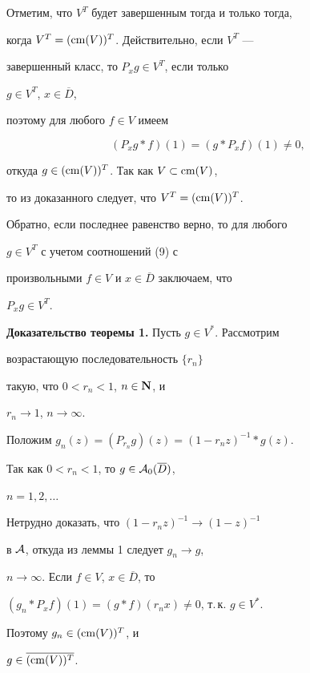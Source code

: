Отметим, что $V^T$ будет завершенным тогда и только тогда,


когда $V^T = (\operatorname{cm} (V))^T$. Действительно, если $V^T$ ---


завершенный класс, то $P_x g \in V^T$, если только 


$g\in V^T$, $x \in \overline{D}$, 


поэтому для любого $f\in V$ имеем


\begin{equation}


(P_x g*f)(1)= (g*P_x f)(1) \neq 0,


\end{equation}


откуда $g\in (\operatorname{cm} (V))^T$. Так как $V \subset \operatorname{cm} (V)$, 


то из доказанного следует, что $V^T =(\operatorname{cm} (V))^T$. 


Обратно, если последнее равенство верно, то для любого 


$g\in V^T$ с учетом соотношений (9) с


произвольными $f\in V$ и $x \in \overline{D}$ заключаем, что 


$P_x g \in V^T$.


\medskip





{\bf Доказательство теоремы 1.} Пусть $g\in V^*$. Рассмотрим 


возрастающую последовательность $\{ r_n \}$ 


такую, что $ 0<r_n <1$, $n \in \bold N$, и 


$r_n \to 1$, $n \to \infty$. 


Положим $g_n (z)= (P_{r_n} g)(z) = (1-r_n z)^{-1} * g(z)$. 


Так как $0<r_n <1$, то $g \in {\cal A}_0 (\overline{D})$, 


$n=1,2,\dots$ 


Нетрудно доказать, что $(1-r_n z)^{-1} \to (1-z)^{-1}$ 


в ${\cal A}$, откуда из леммы 1 следует $g_n{ \to} g$, 


$n{ \to}\infty$. Если $f{\in} V$, $x{ \in} \overline{D}$, то


$(g_n *P_x f)(1)= (g*f)(r_n x){ \neq} 0$, т.\,к. $g\in V^*$.


Поэтому $g_n \in (\operatorname{cm} (V))^T$, и 


$g\in \overline{(\operatorname{cm} (V))^T}$. 





